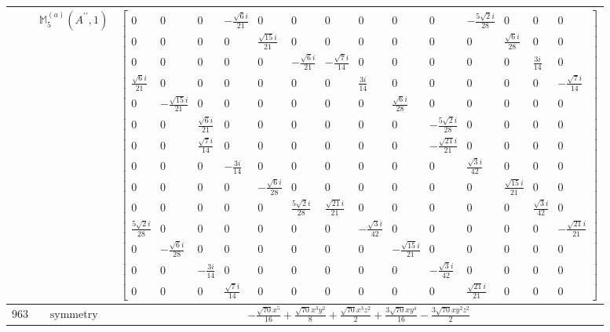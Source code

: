 \documentclass[fleqn,8pt,landscape]{jsarticle}
\begin{document}
\begin{longtable}{ccc}
$  $ & $ \mathbb{M}_{5}^{(a)}(A^{\prime\prime},1) $ & $ \begin{bmatrix} 0 & 0 & 0 & - \frac{\sqrt{6} i}{21} & 0 & 0 & 0 & 0 & 0 & 0 & - \frac{5 \sqrt{2} i}{28} & 0 & 0 & 0 \\ 0 & 0 & 0 & 0 & \frac{\sqrt{15} i}{21} & 0 & 0 & 0 & 0 & 0 & 0 & \frac{\sqrt{6} i}{28} & 0 & 0 \\ 0 & 0 & 0 & 0 & 0 & - \frac{\sqrt{6} i}{21} & - \frac{\sqrt{7} i}{14} & 0 & 0 & 0 & 0 & 0 & \frac{3 i}{14} & 0 \\ \frac{\sqrt{6} i}{21} & 0 & 0 & 0 & 0 & 0 & 0 & \frac{3 i}{14} & 0 & 0 & 0 & 0 & 0 & - \frac{\sqrt{7} i}{14} \\ 0 & - \frac{\sqrt{15} i}{21} & 0 & 0 & 0 & 0 & 0 & 0 & \frac{\sqrt{6} i}{28} & 0 & 0 & 0 & 0 & 0 \\ 0 & 0 & \frac{\sqrt{6} i}{21} & 0 & 0 & 0 & 0 & 0 & 0 & - \frac{5 \sqrt{2} i}{28} & 0 & 0 & 0 & 0 \\ 0 & 0 & \frac{\sqrt{7} i}{14} & 0 & 0 & 0 & 0 & 0 & 0 & - \frac{\sqrt{21} i}{21} & 0 & 0 & 0 & 0 \\ 0 & 0 & 0 & - \frac{3 i}{14} & 0 & 0 & 0 & 0 & 0 & 0 & \frac{\sqrt{3} i}{42} & 0 & 0 & 0 \\ 0 & 0 & 0 & 0 & - \frac{\sqrt{6} i}{28} & 0 & 0 & 0 & 0 & 0 & 0 & \frac{\sqrt{15} i}{21} & 0 & 0 \\ 0 & 0 & 0 & 0 & 0 & \frac{5 \sqrt{2} i}{28} & \frac{\sqrt{21} i}{21} & 0 & 0 & 0 & 0 & 0 & \frac{\sqrt{3} i}{42} & 0 \\ \frac{5 \sqrt{2} i}{28} & 0 & 0 & 0 & 0 & 0 & 0 & - \frac{\sqrt{3} i}{42} & 0 & 0 & 0 & 0 & 0 & - \frac{\sqrt{21} i}{21} \\ 0 & - \frac{\sqrt{6} i}{28} & 0 & 0 & 0 & 0 & 0 & 0 & - \frac{\sqrt{15} i}{21} & 0 & 0 & 0 & 0 & 0 \\ 0 & 0 & - \frac{3 i}{14} & 0 & 0 & 0 & 0 & 0 & 0 & - \frac{\sqrt{3} i}{42} & 0 & 0 & 0 & 0 \\ 0 & 0 & 0 & \frac{\sqrt{7} i}{14} & 0 & 0 & 0 & 0 & 0 & 0 & \frac{\sqrt{21} i}{21} & 0 & 0 & 0 \end{bmatrix} $ \\ \hline
$ 963 $ & $ \text{symmetry} $ & $ - \frac{\sqrt{70} x^{5}}{16} + \frac{\sqrt{70} x^{3} y^{2}}{8} + \frac{\sqrt{70} x^{3} z^{2}}{2} + \frac{3 \sqrt{70} x y^{4}}{16} - \frac{3 \sqrt{70} x y^{2} z^{2}}{2} $ \\

\end{longtable}
\end{document}
